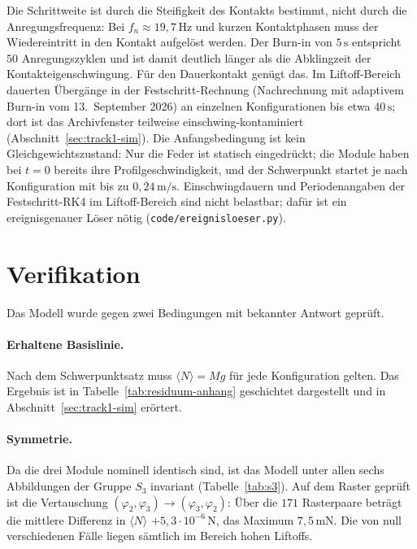 \documentclass[12pt,a4paper]{report}
\begin{document}
Die Schrittweite ist durch die Steifigkeit des Kontakts bestimmt, nicht
durch die Anregungsfrequenz: Bei $f_n \approx 19{,}7\,\mathrm{Hz}$ und
kurzen Kontaktphasen muss der Wiedereintritt in den Kontakt aufgelöst
werden. Der Burn-in von $5\,\mathrm{s}$ entspricht $50$ Anregungszyklen
und ist damit deutlich länger als die Abklingzeit der
Kontakteigenschwingung. Für den Dauerkontakt genügt das. Im
Liftoff-Bereich dauerten Übergänge in der Festschritt-Rechnung
(Nachrechnung mit adaptivem Burn-in vom 13.~September 2026) an einzelnen
Konfigurationen bis etwa $40\,\mathrm{s}$; dort ist das Archivfenster teilweise
einschwing-kontaminiert (Abschnitt~\ref{sec:track1-sim}). Die
Anfangsbedingung ist kein Gleichgewichtszustand: Nur die Feder ist
statisch eingedrückt; die Module haben bei $t = 0$ bereits ihre
Profilgeschwindigkeit, und der Schwerpunkt startet je nach Konfiguration
mit bis zu $0{,}24\,\mathrm{m/s}$. Einschwingdauern und Periodenangaben
der Festschritt-RK4 im Liftoff-Bereich sind nicht belastbar; dafür ist
ein ereignisgenauer Löser nötig (\texttt{code/ereignisloeser.py}).

\section{Verifikation}

Das Modell wurde gegen zwei Bedingungen mit bekannter Antwort geprüft.

\paragraph{Erhaltene Basislinie.}
Nach dem Schwerpunktsatz muss $\langle N \rangle = Mg$ für jede
Konfiguration gelten. Das Ergebnis ist in
Tabelle~\ref{tab:residuum-anhang} geschichtet dargestellt und in
Abschnitt~\ref{sec:track1-sim} erörtert.

\paragraph{Symmetrie.}
Da die drei Module nominell identisch sind, ist das Modell unter allen
sechs Abbildungen der Gruppe $S_3$ invariant (Tabelle~\ref{tab:s3}). Auf
dem Raster geprüft ist die Vertauschung
$(\varphi_2, \varphi_3) \rightarrow (\varphi_3, \varphi_2)$: Über die
$171$ Rasterpaare beträgt die mittlere Differenz in
$\langle N \rangle$ $+5{,}3\cdot10^{-6}\,\mathrm{N}$, das Maximum
$7{,}5\,\mathrm{mN}$. Die von null verschiedenen Fälle liegen
sämtlich im Bereich hohen Liftoffs.
\end{document}

